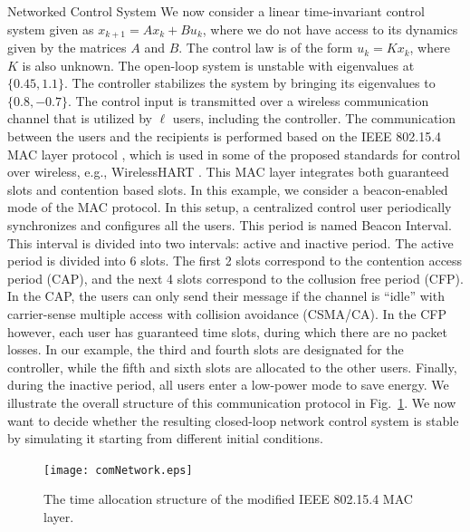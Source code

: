 \begin{subsection}{Networked Control System}\label{networkedEx}
We now consider a linear time-invariant control system given as \mbox{$x_{k+1}=Ax_k+Bu_k$,} where we do not have access to its dynamics given by the matrices $A$ and $B$. The control law is of the form $u_k = Kx_k$, where $K$ is also unknown. The open-loop system is unstable with eigenvalues at $\{0.45, 1.1\}$. The controller stabilizes the system by bringing its eigenvalues to $\{0.8, -0.7\}$.
The control input is transmitted
over a wireless communication channel that is utilized by $\ell$ users, including the controller. The communication between the users and the recipients is performed based on the IEEE 802.15.4 MAC layer protocol \cite{macLayer}, which is used in
some of the proposed standards for control over wireless, e.g., WirelessHART \cite{wirelessHart}. This MAC layer integrates both guaranteed slots and contention based slots. In this example, we consider a beacon-enabled mode of the MAC protocol. In this setup, a centralized control user periodically synchronizes and configures all the users. This period is named Beacon Interval. This interval is divided into two intervals: active and inactive period. The active period is divided into 6 slots. The first 2 slots correspond to the contention access period (CAP), and the next 4 slots correspond to the collusion free period (CFP). In the CAP, the users can only send their message if the channel is ``idle'' with carrier-sense multiple access with collision avoidance (CSMA/CA). In the CFP however, each user has guaranteed time slots, during which there are no packet losses. In our example, the third and fourth slots are designated for the controller, while the fifth and sixth slots are allocated to the other users. Finally, during the inactive period, all users enter a low-power mode to save energy. We illustrate the overall structure of this communication protocol in Fig.~\ref{comExample}. 
We now want to decide whether the resulting closed-loop network control system is stable by simulating it starting from different initial conditions. 
\begin{figure}
\begin{center}
\texttt{[image: comNetwork.eps]}
\end{center}
\caption{The time allocation structure of the modified IEEE 802.15.4 MAC layer.}
\label{comExample}
\end{figure}


\end{subsection}
